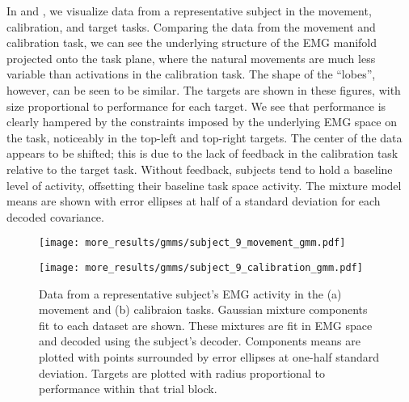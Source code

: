 \documentclass[../main.tex]{subfiles}
\begin{document}
In  and , we visualize data from a representative subject in the movement, calibration, and target tasks. Comparing the data from the movement and calibration task, we can see the underlying structure of the EMG manifold projected onto the task plane, where the natural movements are much less variable than activations in the calibration task. The shape of the ``lobes'', however, can be seen to be similar. The targets are shown in these figures, with size proportional to performance for each target. We see that performance is clearly hampered by the constraints imposed by the underlying EMG space on the task, noticeably in the top-left and top-right targets. The center of the data appears to be shifted; this is due to the lack of feedback in the calibration task relative to the target task. Without feedback, subjects tend to hold a baseline level of activity, offsetting their baseline task space activity. The mixture model means are shown with error ellipses at half of a standard deviation for each decoded covariance.


\begin{sidewaysfigure}[!htb]
  \centering
  \begin{minipage}{0.49\textwidth}
    \texttt{[image: more\_results/gmms/subject\_9\_movement\_gmm.pdf]}
    \subcaption{}
  \end{minipage}%
  \begin{minipage}{0.49\textwidth}
    \texttt{[image: more\_results/gmms/subject\_9\_calibration\_gmm.pdf]}
    \subcaption{}
  \end{minipage}
  \caption[Subject movement and calibration data overlaid on Gaussian mixture]{Data from a representative subject's EMG activity in the (a) movement and (b) calibraion tasks. Gaussian mixture components fit to each dataset are shown. These mixtures are fit in EMG space and decoded using the subject's decoder. Components means are plotted with points surrounded by error ellipses at one-half standard deviation. Targets are plotted with radius proportional to performance within that trial block.}\label{fig:example_prior_gmms}
\end{sidewaysfigure}
\end{document}
